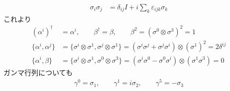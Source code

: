 \documentclass[uplatex,dvipdfmx,a4paper,11pt]{jlreq}
\numberwithin{equation}{section}
\theoremstyle{definition}
\begin{document}
\begin{align}
  \sigma_i\sigma_j & = \delta_{ij}I + i\sum_{k}\varepsilon_{ijk}\sigma_k
\end{align}
これより
\begin{align}
  (\alpha^i)^\dagger     & = \alpha^i, \qquad \beta^\dagger = \beta, \qquad \beta^2 = (\sigma^0\otimes\sigma^3)^2 = 1                                       \\
  \{\alpha^i, \alpha^j\} & = \{\sigma^i\otimes\sigma^1, \sigma^j\otimes\sigma^1\} = (\sigma^i\sigma^j + \sigma^j\sigma^i)\otimes(\sigma^1)^2 = 2\delta^{ij} \\
  \{\alpha^i, \beta\}    & = \{\sigma^i\otimes\sigma^1, \sigma^0\otimes\sigma^3\} = (\sigma^i\sigma^0 - \sigma^0\sigma^i)\otimes(\sigma^1\sigma^3) = 0
\end{align}
ガンマ行列についても
\begin{align}
  \gamma^0 = \sigma_1, \qquad \gamma^1 = i\sigma_2, \qquad \gamma^5 = -\sigma_3
\end{align}
\end{document}
